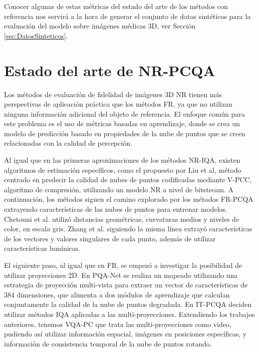 Conocer algunas de estas métricas del estado del arte de los métodos con referencia nos 
servirá a la hora de generar el conjunto de datos sintéticos para la evaluación 
del modelo sobre imágenes médicas 3D, ver Sección \ref{sec:DatosSinteticos}. 

\section{Estado del arte de NR-PCQA}
Los métodos de evaluación de fidelidad de imágenes 3D NR tienen más perspectivas 
de aplicación práctica que los métodos FR, ya que no utilizan ninguna información 
adicional del objeto de referencia.
El enfoque común para este problema es el uso de métricas basadas en 
aprendizaje, donde se crea un modelo de predicción basado en propiedades de la 
nube de puntos que se creen relacionadas con la calidad de percepción.

Al igual que en las primeras aproximaciones de los métodos NR-IQA, existen 
algoritmos de estimación específicos, como el propuesto por Liu et al\cite{bitstreamPCQ},
método centrado en predecir la calidad de nubes de puntos 
codificadas mediante V-PCC, algoritmo de compresión, utilizando un modelo NR 
a nivel de bitstream. A continuación, los métodos siguen el camino explorado 
por los métodos FR-PCQA extrayendo características de las nubes de puntos para 
entrenar modelos.  Chetouni et al.\cite{NR-CNN-3D-PC} utilizó distancias geométricas, curvaturas medios 
y niveles de color, en escala gris. Zhang et al.\cite{NR3DQA} siguiendo la misma 
línea extrayó características de los vectores y valores singulares de cada punto,
además de utilizar características lumínicas.

El siguiente paso, al igual que en FR, se empezó a investigar la posibilidad 
de utilizar proyecciones 2D. En PQA-Net\cite{PQA-Net} se realiza un mapeado 
utilizando una estrategia de proyección multi-vista para extraer un vector de 
características de 384 dimensiones, que alimenta a dos módulos de aprendizaje 
que calculan conjuntamente la calidad de la nube de puntos degradada. 
En IT-PCQA\cite{IT-PCQA} deciden utilizar métodos IQA aplicadas a las multi-proyecciones.
Extendiendo los trabajos anteriores, tenemos VQA-PC\cite{VQA-PC} que trata las 
multi-proyecciones como video, pudiendo así utilizar información espacial, 
imágenes en posiciones específicas, y información de consistencia temporal 
de la nube de puntos rotando. 

